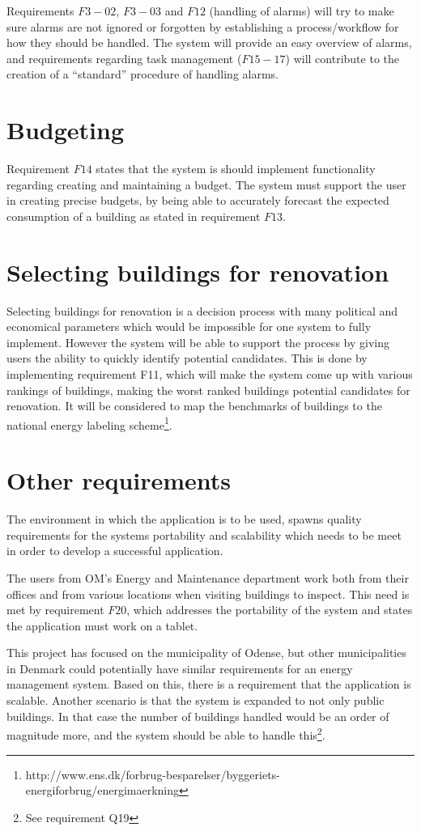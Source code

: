 Requirements $F3-02$, $F3-03$ and $F12$ (handling of alarms) will try to make sure alarms are not ignored or forgotten by establishing a process/workflow for how they should be handled. The system will provide an easy overview of alarms, and requirements regarding task management ($F15-17$) will contribute to the creation of a “standard” procedure of handling alarms.
\section{Budgeting}
Requirement $F14$ states that the system is should implement functionality regarding creating and maintaining a budget. The system must support the user in creating precise budgets, by being able to accurately forecast the expected consumption of a building as stated in requirement $F13$.
\section{Selecting buildings for renovation}
Selecting buildings for renovation is a decision process with many political and economical parameters which would be impossible for one system to fully implement. However the system will be able to support the process by giving users the ability to quickly identify potential candidates. This is done by implementing requirement F11, which will make the system come up with various rankings of buildings, making the worst ranked buildings potential candidates for renovation. It will be considered to map the benchmarks of buildings to the national energy labeling scheme\footnote{ http://www.ens.dk/forbrug-besparelser/byggeriets-energiforbrug/energimaerkning }.
\section{Other requirements}
The environment in which the application is to be used, spawns quality requirements for the systems portability and scalability which needs to be meet in order to develop a successful application. 

The users from OM’s Energy and Maintenance department work both from their offices and from various locations when visiting buildings to inspect. This need is met by requirement $F20$, which addresses the portability of the system and states the application must work on a tablet. 

This project has focused on the municipality of Odense, but other municipalities in Denmark could potentially have similar requirements for an energy management system. Based on this, there is a requirement that the application is scalable. Another scenario is that the system is expanded to not only public buildings. In that case the number of buildings handled would be an order of magnitude more, and the system should be able to handle this\footnote{See requirement Q19}. 
